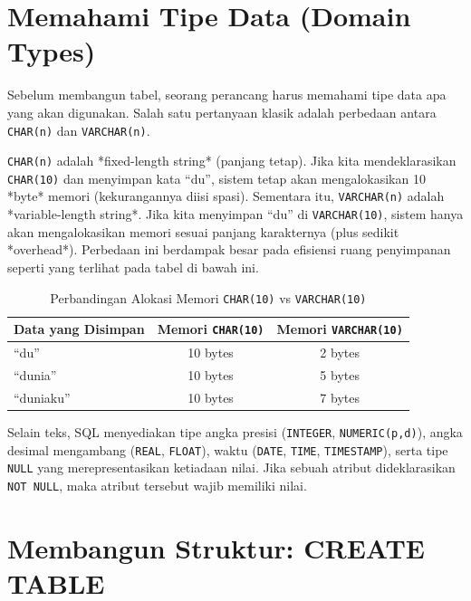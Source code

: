 \documentclass[11pt,a4paper]{article}
\begin{document}
\section{Memahami Tipe Data (Domain Types)}

Sebelum membangun tabel, seorang perancang harus memahami tipe data apa yang akan digunakan. Salah satu pertanyaan klasik adalah perbedaan antara \texttt{CHAR(n)} dan \texttt{VARCHAR(n)}.

\texttt{CHAR(n)} adalah *fixed-length string* (panjang tetap). Jika kita mendeklarasikan \texttt{CHAR(10)} dan menyimpan kata ``du'', sistem tetap akan mengalokasikan 10 *byte* memori (kekurangannya diisi spasi). Sementara itu, \texttt{VARCHAR(n)} adalah *variable-length string*. Jika kita menyimpan ``du'' di \texttt{VARCHAR(10)}, sistem hanya akan mengalokasikan memori sesuai panjang karakternya (plus sedikit *overhead*). Perbedaan ini berdampak besar pada efisiensi ruang penyimpanan seperti yang terlihat pada tabel di bawah ini.

\begin{table}[H]
	\centering
	\small
	\caption{Perbandingan Alokasi Memori \texttt{CHAR(10)} vs \texttt{VARCHAR(10)}}
	\label{tab:char_varchar}
	\begin{tabularx}{0.7\textwidth}{@{} X c c @{}}
		\toprule
		\textbf{Data yang Disimpan} & \textbf{Memori \texttt{CHAR(10)}} & \textbf{Memori \texttt{VARCHAR(10)}} \\
		\midrule
		``du''                      & 10 bytes                          & 2 bytes                              \\
		``dunia''                   & 10 bytes                          & 5 bytes                              \\
		``duniaku''                 & 10 bytes                          & 7 bytes                              \\
		\bottomrule
	\end{tabularx}
\end{table}

Selain teks, SQL menyediakan tipe angka presisi (\texttt{INTEGER}, \texttt{NUMERIC(p,d)}), angka desimal mengambang (\texttt{REAL}, \texttt{FLOAT}), waktu (\texttt{DATE}, \texttt{TIME}, \texttt{TIMESTAMP}), serta tipe \texttt{NULL} yang merepresentasikan ketiadaan nilai. Jika sebuah atribut dideklarasikan \texttt{NOT NULL}, maka atribut tersebut wajib memiliki nilai.

\section{Membangun Struktur: CREATE TABLE}
\end{document}
